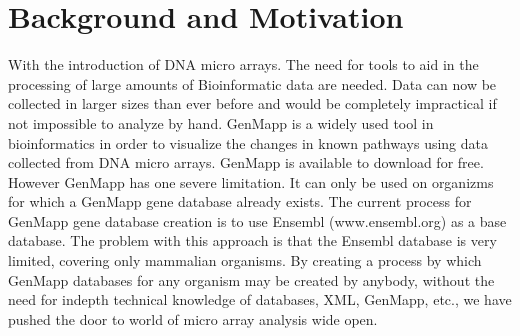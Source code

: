 \section{Background and Motivation}
With the introduction of DNA micro arrays.  The need for tools to aid in the processing of large amounts of Bioinformatic data are needed.  Data can now be collected in larger sizes than ever before and would be completely impractical if not impossible to analyze by hand.  GenMapp is a widely used tool in bioinformatics in order to visualize the changes in known pathways using data collected from DNA micro arrays. GenMapp is available to download for free. However GenMapp has one severe limitation.  It can only be used on organizms for which a GenMapp gene database already exists.  The current process for GenMapp gene database creation is to use Ensembl (www.ensembl.org) as a base database.   The problem with this approach is that the Ensembl database is very limited, covering only mammalian organisms.  By creating a process by which GenMapp databases for any organism may be created by anybody, without the need for indepth technical knowledge of databases, XML, GenMapp, etc., we have pushed the door to world of micro array analysis wide open.

\cite{genmapp:ng} \cite{mappfinder:gb} \cite{genmapp:bax}